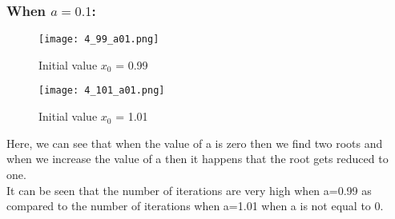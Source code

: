 \documentclass[a4paper]{article}
\begin{document}
        \subsubsection{When $a=0.1$:}
        \begin{figure}[!htbp]
          \centering
          \begin{minipage}[b]{0.45\textwidth}
\texttt{[image: 4\_99\_a01.png]}
            \caption{Initial value $x_{0}$ = 0.99 }
          \end{minipage}
          \hfill
          \begin{minipage}[b]{0.45\textwidth}
            \texttt{[image: 4\_101\_a01.png]}
            \caption{Initial value $x_{0}$ = 1.01}
          \end{minipage}
        \end{figure}
        \large{Here, we can see that when the value of a is zero then we find two roots and when we increase the value of a then it happens that the root gets reduced to one.\\
        It can be seen that the number of iterations are very high when a=0.99 as compared to the number of iterations when a=1.01 when a is not equal to 0.}
\end{document}
